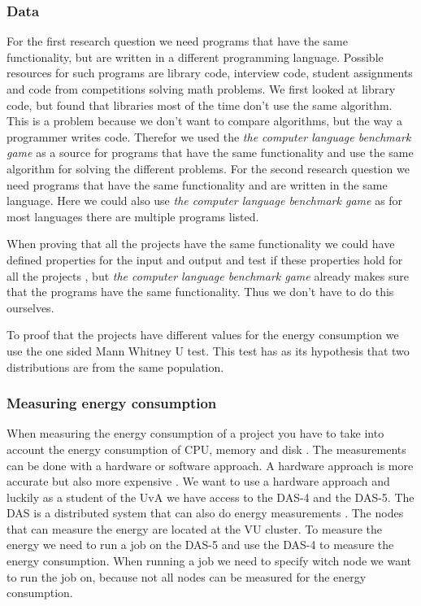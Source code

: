 \subsubsection{Data}
For the first research question we need programs that have the same functionality, but are written in a different programming language. Possible resources for such programs are library code, interview code, student assignments and code from competitions solving math problems. We first looked at library code, but found that libraries most of the time don't use the same algorithm. This is a problem because we don't want to compare algorithms, but the way a programmer writes code. Therefor we used the \textit{the computer language benchmark game} \cite{gouy:2019} as a source for programs that have the same functionality and use the same algorithm for solving the different problems. For the second research question we need programs that have the same functionality and are written in the same language. Here we could also use \textit{the computer language benchmark game} as for most languages there are multiple programs listed.

When proving that all the projects have the same functionality we could have defined properties for the input and output and test if these properties hold for all the projects \cite{mens2004survey}, but \textit{the computer language benchmark game} already makes sure that the programs have the same functionality. Thus we don't have to do this ourselves.

To proof that the projects have different values for the energy consumption we use the one sided Mann Whitney U test. This test has as its hypothesis that two distributions are from the same population.

\subsubsection{Measuring energy consumption}
When measuring the energy consumption of a project you have to take into account the energy consumption of CPU, memory and disk \cite{acar2016impact}. The measurements can be done with a hardware or software approach. A hardware approach is more accurate but also more expensive \cite{acar2016impact}. We want to use a hardware approach and luckily as a student of the UvA we have access to the DAS-4 and the DAS-5. The DAS is a distributed system that can also do energy measurements \cite{bal2016medium}. The nodes that can measure the energy are located at the VU cluster. To measure the energy we need to run a job on the DAS-5 and use the DAS-4 to measure the energy consumption. When running a job we need to specify witch node we want to run the job on, because not all nodes can be measured for the energy consumption. 

